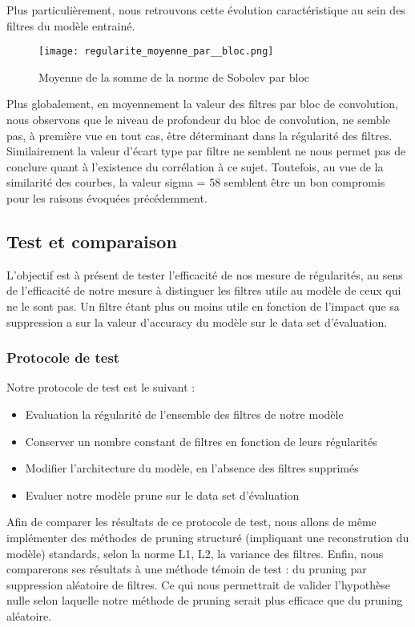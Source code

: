 \documentclass[12pt,a4paper]{article}
\begin{document}
Plus particulièrement, nous retrouvons cette évolution caractéristique au sein des filtres du modèle entrainé. 
\begin{figure}[H] %
    \centering    %
    \texttt{[image: regularite\_moyenne\_par\_\_bloc.png]} %
    \caption{Moyenne de la somme de la norme de Sobolev par bloc} %
    \label{fig:mon_image} %
\end{figure}
Plus globalement, en moyennement la valeur des filtres par bloc de convolution, nous observons que le niveau de profondeur du bloc de convolution, ne semble pas, à première vue en tout cas, être déterminant dans la régularité des filtres. 
Similairement la valeur d'écart type par filtre ne semblent ne nous permet pas de conclure quant à l'existence du corrélation à ce sujet. 
Toutefois, au vue de la similarité des courbes, la valeur sigma = 58 semblent être un bon compromis pour les raisons évoquées précédemment.
\subsection{Test et comparaison}
L'objectif est à présent de tester l'efficacité de nos mesure de régularités, au sens de l'efficacité de notre mesure à distinguer les filtres utile au modèle de ceux qui ne le sont pas. Un filtre étant plus ou moins utile en fonction de l'impact que sa suppression a sur la valeur d'accuracy du modèle sur le data set d'évaluation.
\subsubsection{Protocole de test}
Notre protocole de test est le suivant :
\begin{itemize}
    \item Evaluation la régularité de l'ensemble des filtres de notre modèle
    \item Conserver un nombre constant de filtres en fonction de leurs régularités
    \item Modifier l'architecture du modèle, en l'absence des filtres supprimés
    \item Evaluer notre modèle prune sur le data set d'évaluation
\end{itemize}
Afin de comparer les résultats de ce protocole de test, nous allons de même implémenter des méthodes de pruning structuré (impliquant une reconstrution du modèle) standards, selon la norme L1, L2, la variance des filtres. 
Enfin, nous comparerons ses résultats à une méthode témoin de test : du pruning par suppression aléatoire de filtres. Ce qui nous permettrait de valider l'hypothèse nulle selon laquelle notre méthode de pruning serait plus efficace que du pruning aléatoire.
\end{document}
